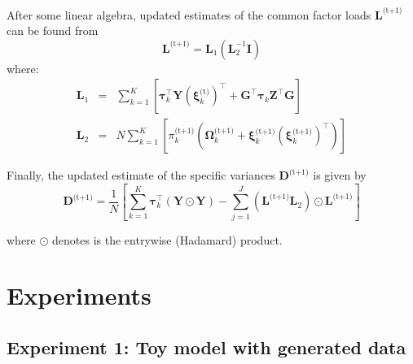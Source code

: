 \documentclass[twocolumn]{aastex61}
\newcommand{\vect}[1]{\boldsymbol{\mathbf{#1}}}
\renewcommand{\vec}[1]{\vect{#1}}
\newcommand{\weight}{\pi}
\newcommand{\data}{\textbf{Y}}
\newcommand{\vecdata}{\vec\data}
\newcommand{\nextstep}{^\textrm{(t+1)}}
\newcommand{\thisstep}{^\textrm{(t)}}
\newcommand{\transpose}{^\intercal}
\newcommand{\eye}{\textbf{I}}
\newcommand{\factorloads}{\textbf{L}}
\newcommand{\specificvariance}{\vec{D}}
\newcommand{\scoremeans}{\vec\xi}
\newcommand{\scorecovs}{\vec\Omega}
\newcommand{\NumData}{N}
\newcommand{\NumComponents}{K}
\newcommand{\numcomponents}{k}
\begin{document}
After some linear algebra, updated estimates of the common factor loads $\factorloads\nextstep$
can be found from
\begin{equation}
	\factorloads\nextstep = \factorloads_{1}\left(\factorloads_{2}^{-1}\eye\right)
\end{equation}
\noindent{}where:
\begin{eqnarray}
	\factorloads_1 &=& \sum_{\numcomponents=1}^{\NumComponents}\left[ \vec\tau_\numcomponents\transpose\vecdata\left(\scoremeans_\numcomponents\thisstep\right)\transpose + 
	\vec{G}\transpose\vec\tau_\numcomponents\vec{Z}\transpose\vec{G}\right] \\
	\factorloads_2 &=& N\sum_{\numcomponents=1}^{\NumComponents}\left[\weight_\numcomponents\nextstep\left(\scorecovs_\numcomponents\nextstep + \scoremeans_\numcomponents\nextstep\left(\scoremeans_\numcomponents\nextstep\right)\transpose\right)\right]
\end{eqnarray}


Finally, the updated estimate of the specific variances $\specificvariance\nextstep$ is given
by
\begin{equation}
	\specificvariance\nextstep = \frac{1}{\NumData}\left[\sum^{\NumComponents}_{\numcomponents=1}\vec\tau_\numcomponents\transpose\left(\vecdata\odot\vecdata\right) - \sum_{j=1}^{J}\left(\factorloads\nextstep\factorloads_2\right)\odot\factorloads\nextstep\right]
\end{equation}

\noindent{}where $\odot$ denotes is the entrywise (Hadamard) product.


\section{Experiments} \label{sec:experiments}


\subsection{Experiment 1: Toy model with generated data} \label{sec:experiment-toy-model}
\end{document}
